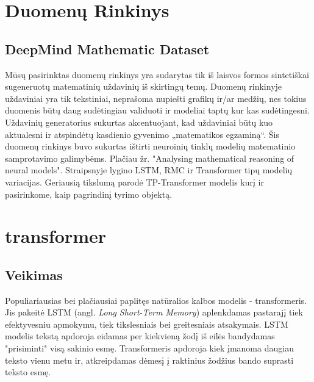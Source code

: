 \documentclass[conference]{IEEEtran}
\begin{document}
\section{Duomenų Rinkinys}

\subsection{DeepMind Mathematic Dataset}

Mūsų pasirinktas duomenų rinkinys yra sudarytas tik iš laisvos formos sintetiškai sugeneruotų matematinių uždavinių iš skirtingų temų. Duomenų rinkinyje uždaviniai yra tik tekstiniai, neprašoma nupiešti grafikų ir/ar medžių, nes tokius duomenis būtų daug sudėtingiau validuoti ir modeliai taptų kur kas sudėtingesni. Uždavinių generatorius sukurtas akcentuojant, kad uždaviniai būtų kuo aktualesni ir atspindėtų kasdienio gyvenimo „matematikos egzaminą“. Šis duomenų rinkinys buvo sukurtas ištirti neuroinių tinklų modelių matematinio samprotavimo galimybėms. Plačiau žr. "Analysing mathematical reasoning of neural models"\cite{deeplab}. Straipsnyje lygino LSTM, RMC ir Transformer tipų modelių variacijas. Geriausią tikslumą parodė TP-Transformer modelis kurį ir pasirinkome, kaip pagrindinį tyrimo objektą.






\section{transformer}

\subsection{Veikimas}
Populiariausias bei plačiausiai paplitęs natūralios kalbos modelis - transformeris. Jis pakeitė LSTM (angl. \textit{Long Short-Term Memory}) aplenkdamas pastarajį tiek efektyvesniu apmokymu, tiek tikslesniais bei greitesniais atsakymais. LSTM modelis tekstą apdoroja eidamas per kiekvieną žodį iš eilės bandydamas "prisiminti" visą sakinio esmę. Transformeris apdoroja kiek įmanoma daugiau teksto vienu metu ir, atkreipdamas dėmesį į raktinius žodžius bando suprasti teksto esmę.
\end{document}
